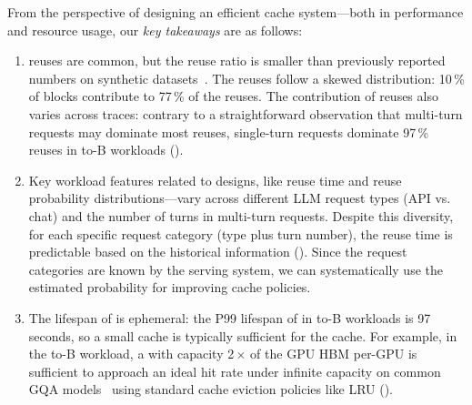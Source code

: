 From the perspective of designing an efficient {\kvcache} cache system---both in performance
and resource usage,
our \emph{key takeaways} are as follows: \\[-15pt]
\begin{enumerate}[leftmargin=*,leftmargin=10pt,itemindent=0pt]
    \item {\kvcache} reuses are common,
    but the reuse ratio is smaller than previously reported numbers
    on synthetic datasets~\cite{cachedattention,DBLP:journals/corr/abs-2403-14401}.
    The reuses follow a skewed distribution:
    10\,\% of {\kvcache} blocks contribute to 77\,\% of the reuses.
    The contribution of {\kvcache} reuses also varies across traces:
    contrary to a straightforward observation that multi-turn requests may dominate most reuses,
    single-turn requests dominate 97\,\%
    {\kvcache} reuses in to-B workloads (\textsection{\ref{sec:workload-patterns}}).  \\[-15pt]

    \item Key workload features related to {\kvcache} designs,
    like reuse time and reuse probability distributions---vary across different LLM request types (API vs. chat)
    and the number of turns in multi-turn requests.
    Despite this diversity, for each specific request category (type plus turn number),
    the reuse time is predictable based on the historical information (\textsection{\ref{sec:motiv-temporal-spatial}}).
    Since the request categories are known by the serving system,
    we can systematically use the estimated probability for improving cache policies. \\[-15pt]

    \item The lifespan of {\kvcache} is ephemeral: the P99 lifespan
    of {\kvcache} in to-B workloads is 97 seconds,
    so a small cache is typically sufficient for the {\kvcache} cache.
    For example, in the to-B workload,
    a {\kvcache} with capacity 2\,$\times$ of the GPU HBM per-GPU
    is sufficient to approach an ideal hit rate under infinite capacity on
    common GQA models~\cite{DBLP:conf/emnlp/AinslieLJZLS23}
    using standard cache eviction policies like LRU (\textsection{\ref{sec:analyze-capacity}}).
\end{enumerate}

